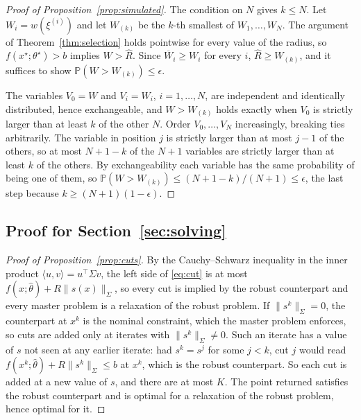 \begin{proof}[Proof of Proposition~\ref{prop:simulated}]
The condition on $N$ gives $k \le N$. Let $W_i = w(\xi^{(i)})$ and let
$W_{(k)}$ be the $k$-th smallest of $W_1,\dots,W_N$. The argument of
Theorem~\ref{thm:selection} holds pointwise for every value of the radius, so
$f(x^\star;\theta^\star) > b$ implies $W > \hat R$. Since
$\overline W_i \ge W_i$ for every $i$, $\hat R \ge W_{(k)}$, and it suffices to
show $\mathbb{P}(W > W_{(k)}) \le \epsilon$.

The variables $V_0 = W$ and $V_i = W_i$, $i = 1,\dots,N$, are independent and
identically distributed, hence exchangeable, and $W > W_{(k)}$ holds exactly
when $V_0$ is strictly larger than at least $k$ of the other $N$. Order
$V_0,\dots,V_N$ increasingly, breaking ties arbitrarily. The variable in
position $j$ is strictly larger than at most $j-1$ of the others, so at most
$N+1-k$ of the $N+1$ variables are strictly larger than at least $k$ of the
others. By exchangeability each variable has the same probability of being
one of them, so
$\mathbb{P}(W > W_{(k)}) \le (N+1-k)/(N+1) \le \epsilon$, the last step
because $k \ge (N+1)(1-\epsilon)$.
\end{proof}

\subsection{Proof for Section~\ref{sec:solving}}

\begin{proof}[Proof of Proposition~\ref{prop:cuts}]
By the Cauchy--Schwarz inequality in the inner product
$\langle u, v\rangle = u^\top\Sigma v$, the left side of \eqref{eq:cut} is at
most $f(x;\hat\theta) + R\|s(x)\|_\Sigma$, so every cut is implied by the
robust counterpart and every master problem is a relaxation of the robust
problem. If $\|s^k\|_\Sigma = 0$, the counterpart at $x^k$ is the nominal
constraint, which the master problem enforces, so cuts are added only at
iterates with $\|s^k\|_\Sigma \neq 0$. Such an iterate has a value of $s$ not
seen at any earlier iterate: had $s^k = s^j$ for some $j < k$, cut $j$ would
read $f(x^k;\hat\theta) + R\|s^k\|_\Sigma \le b$ at $x^k$, which is the robust
counterpart. So each cut is added at a new value of $s$, and there are at
most $K$. The point returned satisfies the robust counterpart and is optimal
for a relaxation of the robust problem, hence optimal for it.
\end{proof}
